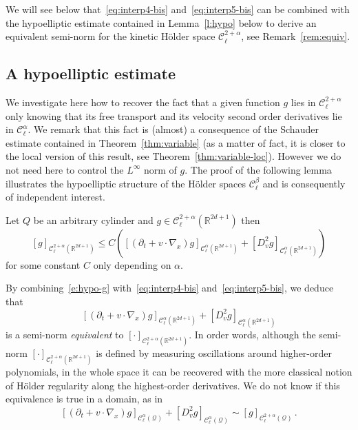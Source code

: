 \documentclass[AHL,Unicode,longabstracts,published]{cedram}
\newcommand{\R}{\mathbb{R}}
\newcommand{\cC}{\mathcal{C}}
\newcommand{\cQ}{\mathcal{Q}}
\begin{document}
We will see below that~\eqref{eq:interp4-bis} and~\eqref{eq:interp5-bis} can be combined with the hypoelliptic estimate contained in Lemma~\ref{l:hypo} below to derive an equivalent semi-norm for the kinetic H\"older space $\cC_\ell^{2+\alpha}$, see Remark~\ref{rem:equiv}.

\subsection{A hypoelliptic estimate}

We investigate here how to recover the fact that a given function $g$ lies in $\cC^{2+\alpha}_\ell$ only knowing that its free transport and its velocity second order derivatives lie in $\cC_\ell^\alpha$. We remark that this fact is (almost) a consequence of the Schauder estimate contained in Theorem~\ref{thm:variable} (as a matter of fact, it is closer to the local version of this result, see Theorem~\ref{thm:variable-loc}). However we do not need here to control the $L^\infty$ norm of $g$. The proof of the following lemma illustrates the hypoelliptic structure of the H\"older spaces $\cC_\ell^\beta$ and is consequently of independent interest.


\begin{lemm}\label{l:hypo}
Let $Q$ be an arbitrary cylinder and $g \in \cC_\ell^{2+\alpha} (\R^{2d+1})$ then
\begin{equation}\label{e:hypo-g}
[g]_{\cC_\ell^{2+\alpha}\left(\R^{2d+1}\right)} \le C \left(\left[\left(\partial_t + v \cdot \nabla_x\right) g\right]_{\cC_\ell^{\alpha}\left(\R^{2d+1}\right)}+ \left[D^2_v g\right]_{\cC_\ell^{\alpha}\left(\R^{2d+1}\right)}\right)
\end{equation}
for some constant $C$ only depending on $\alpha$.
\end{lemm}

\begin{rema}\label{rem:equiv}
By combining~\eqref{e:hypo-g} with~\eqref{eq:interp4-bis} and~\eqref{eq:interp5-bis}, we deduce that
\[
\left[\left(\partial_t + v \cdot \nabla_x\right) g\right]_{\cC_\ell^{\alpha}\left(\R^{2d+1}\right)} + \left[D^2_v g\right]_{\cC_\ell^{\alpha}\left(\R^{2d+1}\right)}
\]
is a semi-norm \emph{equivalent} to $[\cdot]_{\cC_\ell^{2+\alpha}(\R^{2d+1})}$. In order words, although the semi-norm $[\cdot]_{\cC_\ell^{2+\alpha}(\R^{2d+1})}$ is defined by measuring oscillations around higher-order polynomials, in the whole space it can be recovered with the more classical notion of H\"older regularity along the highest-order derivatives. We do not know if this equivalence is true in a domain, as in
\[
\left[\left(\partial_t + v \cdot \nabla_x\right) g\right]_{\cC_\ell^{\alpha}(\cQ)} + \left[D^2_v g\right]_{\cC_\ell ^\alpha (\cQ)} \sim [g]_{\cC_\ell^{2+\alpha}(\cQ)}\,.
\]
\end{rema}
\end{document}
